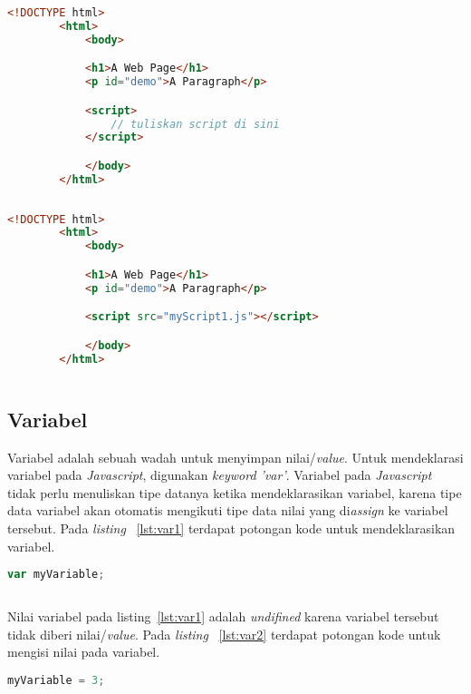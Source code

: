 \begin{lstlisting}[language=HTML, caption=\textit{Internal Javascript}, label={lst:script1}]
	<!DOCTYPE html>
		<html>
			<body> 

			<h1>A Web Page</h1>
			<p id="demo">A Paragraph</p>

			<script>
				// tuliskan script di sini
			</script>

			</body>
		</html>
		
\end{lstlisting}

\begin{lstlisting}[language=HTML, caption=\textit{External Javascript}, label={lst:script2}]
	<!DOCTYPE html>
		<html>
			<body> 

			<h1>A Web Page</h1>
			<p id="demo">A Paragraph</p>

			<script src="myScript1.js"></script>

			</body>
		</html>
	
\end{lstlisting}

\subsection{Variabel}
Variabel adalah sebuah wadah untuk menyimpan nilai/\textit{value}. Untuk mendeklarasi variabel pada \textit{Javascript}, digunakan \textit{keyword 'var'}. Variabel pada \textit{Javascript} tidak perlu menuliskan tipe datanya ketika mendeklarasikan variabel, karena tipe data variabel akan otomatis mengikuti tipe data nilai yang di\textit{assign} ke variabel tersebut.  Pada \textit{listing} ~\ref{lst:var1} terdapat potongan kode untuk mendeklarasikan variabel.

\begin{lstlisting}[language=Javascript, caption=Deklarasi variabel, label={lst:var1}]
	var myVariable;
	
\end{lstlisting}

Nilai variabel pada listing~\ref{lst:var1} adalah \textit{undifined} karena variabel tersebut tidak diberi nilai/\textit{value}. Pada \textit{listing} ~\ref{lst:var2} terdapat potongan kode untuk mengisi nilai pada variabel. 

\begin{lstlisting}[language=Javascript, caption=Mengisi nilai sebuah variabel, label={lst:var2}]
	myVariable = 3;	
	
\end{lstlisting}

